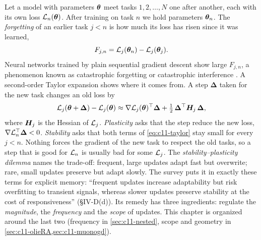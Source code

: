 Let a model with parameters $\bm{\theta}$ meet tasks $1, 2, \dots, N$ one after another, each with
its own loss $\mathcal{L}_n(\bm{\theta})$. After training on task $n$ we hold parameters $\bm{\theta}_n$. The
\emph{forgetting} of an earlier task $j<n$ is how much its loss has risen since it was learned,
\begin{equation}
  F_{j,n} = \mathcal{L}_j(\bm{\theta}_n) - \mathcal{L}_j(\bm{\theta}_j).
  \label{eq:c11-forgetting}
\end{equation}
Neural networks trained by plain sequential gradient descent show large $F_{j,n}$, a
phenomenon known as catastrophic forgetting or catastrophic interference
\citep{c11-mccloskey1989catastrophic,c11-french1999catastrophic}. A second-order Taylor expansion
shows where it comes from. A step $\bm{\Delta}$ taken for the new task changes an old loss by
\begin{equation}
  \mathcal{L}_j(\bm{\theta} + \bm{\Delta}) - \mathcal{L}_j(\bm{\theta})
  \approx \nabla\mathcal{L}_j(\bm{\theta})^{\top}\bm{\Delta} + \tfrac12\,\bm{\Delta}^{\top}\bm{H}_j\,\bm{\Delta},
  \label{eq:c11-taylor}
\end{equation}
where $\bm{H}_j$ is the Hessian of $\mathcal{L}_j$. \emph{Plasticity} asks that the step reduce the new
loss, $\nabla\mathcal{L}_n^{\top}\bm{\Delta} < 0$. \emph{Stability} asks that both terms of
\cref{eq:c11-taylor} stay small for every $j<n$. Nothing forces the gradient of the new task to
respect the old tasks, so a step that is good for $\mathcal{L}_n$ is usually bad for some $\mathcal{L}_j$.
The \emph{stability--plasticity dilemma} names the trade-off: frequent, large updates adapt fast
but overwrite; rare, small updates preserve but adapt slowly. The survey puts it in exactly these
terms for explicit memory: ``frequent updates increase adaptability but risk overfitting to
transient signals, whereas slower updates preserve stability at the cost of responsiveness''
(\S IV-D(d)). Its remedy has three ingredients: regulate the \emph{magnitude}, the
\emph{frequency} and the \emph{scope} of updates. This chapter is organized around the last two
(frequency in \cref{sec:c11-nested}, scope and geometry in \cref{sec:c11-olieRA,sec:c11-muonogd}).

